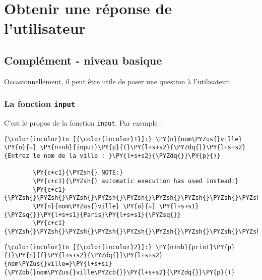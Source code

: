     
    
    
    

    

    \hypertarget{obtenir-une-ruxe9ponse-de-lutilisateur}{%
\section{Obtenir une réponse de
l'utilisateur}\label{obtenir-une-ruxe9ponse-de-lutilisateur}}

    \hypertarget{compluxe9ment---niveau-basique}{%
\subsection{Complément - niveau
basique}\label{compluxe9ment---niveau-basique}}

    Occasionnellement, il peut être utile de poser une question à
l'utilisateur.

    \hypertarget{la-fonction-input}{%
\subsubsection{\texorpdfstring{La fonction
\texttt{input}}{La fonction input}}\label{la-fonction-input}}

    C'est le propos de la fonction \texttt{input}. Par exemple~:

    \begin{Verbatim}[commandchars=\\\{\}]
{\color{incolor}In [{\color{incolor}1}]:} \PY{n}{nom\PYZus{}ville} \PY{o}{=} \PY{n+nb}{input}\PY{p}{(}\PY{l+s+s2}{\PYZdq{}}\PY{l+s+s2}{Entrez le nom de la ville : }\PY{l+s+s2}{\PYZdq{}}\PY{p}{)}
        
        \PY{c+c1}{\PYZsh{} NOTE:}
        \PY{c+c1}{\PYZsh{} automatic execution has used instead:}
        \PY{c+c1}{\PYZsh{}\PYZsh{}\PYZsh{}\PYZsh{}\PYZsh{}\PYZsh{}\PYZsh{}\PYZsh{}\PYZsh{}\PYZsh{}}
        \PY{n}{nom\PYZus{}ville} \PY{o}{=} \PY{l+s+s1}{\PYZsq{}}\PY{l+s+s1}{Paris}\PY{l+s+s1}{\PYZsq{}}
        \PY{c+c1}{\PYZsh{}\PYZsh{}\PYZsh{}\PYZsh{}\PYZsh{}\PYZsh{}\PYZsh{}\PYZsh{}\PYZsh{}\PYZsh{}}
\end{Verbatim}


    \begin{Verbatim}[commandchars=\\\{\}]
{\color{incolor}In [{\color{incolor}2}]:} \PY{n+nb}{print}\PY{p}{(}\PY{n}{f}\PY{l+s+s2}{\PYZdq{}}\PY{l+s+s2}{nom\PYZus{}ville=}\PY{l+s+si}{\PYZob{}nom\PYZus{}ville\PYZcb{}}\PY{l+s+s2}{\PYZdq{}}\PY{p}{)}
\end{Verbatim}


